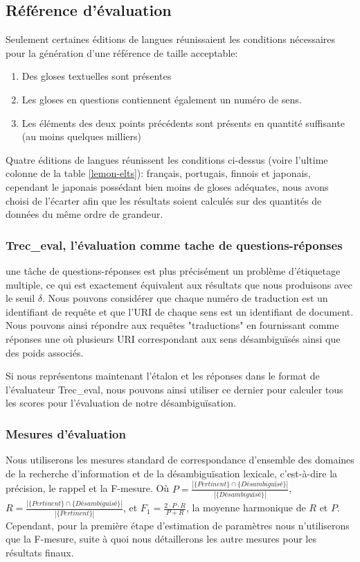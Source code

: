 \documentclass[10pt,a4paper,twoside]{article}
\begin{document}
\subsection{Référence d'évaluation}
Seulement certaines éditions de langues réunissaient les conditions nécessaires pour la génération d'une référence de taille acceptable: 
\begin{enumerate}
	\item Des gloses textuelles sont présentes
	\item Les gloses en questions contiennent également un numéro de sens.
	\item Les éléments des deux points précédents sont présents en quantité suffisante (au moins quelques milliers)
\end{enumerate}

Quatre éditions de langues réunissent les conditions ci-dessus (voire l'ultime colonne de  la table \ref{lemon-elts}): français, portugais, finnois et japonais, cependant le japonais possédant bien moins de gloses adéquates, nous avons choisi de l'écarter afin que les résultats soient calculés sur des quantités de données du même ordre de grandeur.

\subsubsection{Trec\_eval, l'évaluation comme tache de questions-réponses}

une tâche de questions-réponses est plus précisément un problème d'étiquetage multiple, ce qui est exactement équivalent aux résultats que nous produisons avec le seuil \(\delta\). Nous pouvons considérer que chaque numéro de traduction est un identifiant de requête et que l'URI de chaque sens est un identifiant de document. Nous pouvons ainsi répondre aux requêtes  "traductions" en fournissant comme réponses une où plusieurs URI correspondant aux sens désambiguïsés ainsi que des poids associés. 

Si nous représentons maintenant l'étalon et les réponses dans le format de l'évaluateur Trec\_eval, nous pouvons ainsi utiliser ce dernier pour calculer tous les scores pour l'évaluation de notre désambiguïsation.

\subsubsection{Mesures d'évaluation}
Nous utiliserons les mesures standard de correspondance d'ensemble des domaines de la recherche d'information et de la désambiguïsation lexicale, c'est-à-dire la précision, le rappel et la F-mesure. Où \(P=\frac{|\{Pertinent\}\cap\{Désambiguïsé\}|}{|\{Désambiguïsé\}|}\), \(R=\frac{|\{Pertinent\}\cap\{Désambiguïsé\}|}{|\{Pertinent\}|}\), et \(F_1 = \frac{2\cdot P \cdot R}{P + R} \), la moyenne harmonique de \(R\) et \(P\). Cependant, pour la première étape d'estimation de paramètres nous n'utiliserons que la F-mesure, suite à quoi nous détaillerons les autre mesures pour les résultats finaux.
\end{document}
